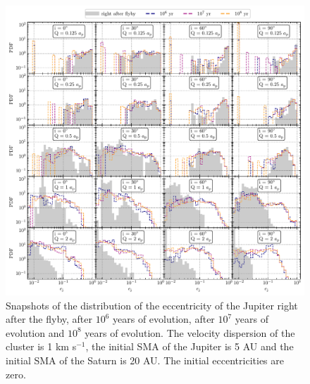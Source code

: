 \documentclass[twocolumn]{aastex63}
\begin{document}
\begin{figure}
    \includegraphics[width=\textwidth]{figs/migration_ej-r4.pdf}
    \caption{Snapshots of the distribution of the eccentricity of the Jupiter right after the flyby, after $10^6$ years of evolution, after $10^7$ years of evolution and $10^8$ years of evolution. The velocity dispersion of the cluster is 1 km s$^{-1}$, the initial SMA of the Jupiter is 5 AU and the initial SMA of the Saturn is 20 AU. The initial eccentricities are zero.}
    \label{fig:hj-ej-s1-r4}
\end{figure}
\end{document}
